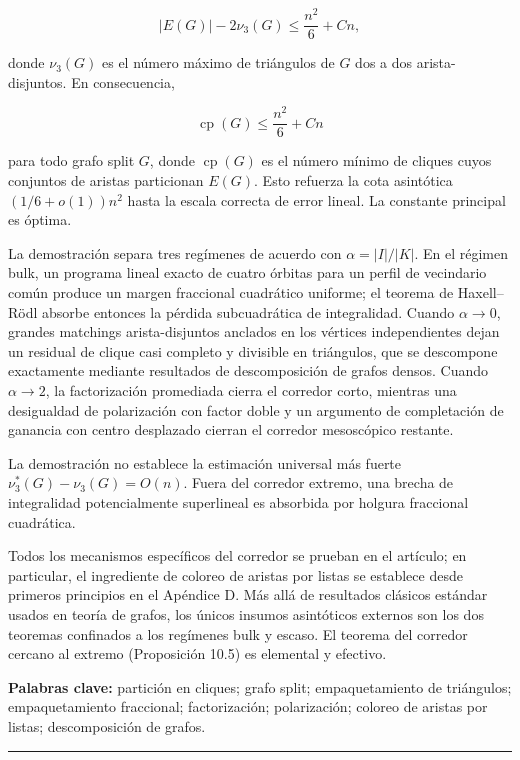 \documentclass[
  11pt,
]{article}
\begin{document}
\[
|E(G)|-2\nu_3(G)
\le
\frac{n^2}{6}+Cn,
\]

donde \(\nu_3(G)\) es el número máximo de triángulos de \(G\) dos a dos arista-disjuntos. En consecuencia,

\[
\operatorname{cp}(G)
\le
\frac{n^2}{6}+Cn
\]

para todo grafo split \(G\), donde \(\operatorname{cp}(G)\) es el número mínimo de cliques cuyos conjuntos de aristas particionan \(E(G)\). Esto refuerza la cota asintótica \((1/6+o(1))n^2\) hasta la escala correcta de error lineal. La constante principal es óptima.

La demostración separa tres regímenes de acuerdo con \(\alpha=|I|/|K|\). En el régimen bulk, un programa lineal exacto de cuatro órbitas para un perfil de vecindario común produce un margen fraccional cuadrático uniforme; el teorema de Haxell--Rödl absorbe entonces la pérdida subcuadrática de integralidad. Cuando \(\alpha\to0\), grandes matchings arista-disjuntos anclados en los vértices independientes dejan un residual de clique casi completo y divisible en triángulos, que se descompone exactamente mediante resultados de descomposición de grafos densos. Cuando \(\alpha\to2\), la factorización promediada cierra el corredor corto, mientras una desigualdad de polarización con factor doble y un argumento de completación de ganancia con centro desplazado cierran el corredor mesoscópico restante.

La demostración no establece la estimación universal más fuerte \(\nu_3^*(G)-\nu_3(G)=O(n)\). Fuera del corredor extremo, una brecha de integralidad potencialmente superlineal es absorbida por holgura fraccional cuadrática.

Todos los mecanismos específicos del corredor se prueban en el artículo; en particular, el ingrediente de coloreo de aristas por listas se establece desde primeros principios en el Apéndice D. Más allá de resultados clásicos estándar usados en teoría de grafos, los únicos insumos asintóticos externos son los dos teoremas confinados a los regímenes bulk y escaso. El teorema del corredor cercano al extremo (Proposición 10.5) es elemental y efectivo.

\textbf{Palabras clave:} partición en cliques; grafo split; empaquetamiento de triángulos; empaquetamiento fraccional; factorización; polarización; coloreo de aristas por listas; descomposición de grafos.

\begin{center}\rule{0.5\linewidth}{0.5pt}\end{center}
\end{document}
